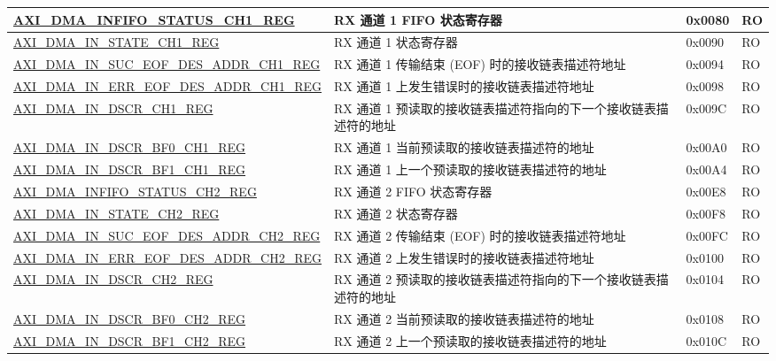 \begin{longtable}{ | l | l | p{1.3cm} | l | }
\hyperref[regdesc:AXIDMAINFIFOSTATUSCHNREG]{AXI\_DMA\_INFIFO\_STATUS\_CH1\_REG} & RX 通道 1 FIFO 状态寄存器 & 0x0080 & RO \\ \hline
\hyperref[regdesc:AXIDMAINSTATECHNREG]{AXI\_DMA\_IN\_STATE\_CH1\_REG} & RX 通道 1 状态寄存器 & 0x0090 & RO \\ \hline
\hyperref[regdesc:AXIDMAINSUCEOFDESADDRCHNREG]{AXI\_DMA\_IN\_SUC\_EOF\_DES\_ADDR\_CH1\_REG} & RX 通道 1 传输结束 (EOF) 时的接收链表描述符地址 & 0x0094 & RO \\ \hline
\hyperref[regdesc:AXIDMAINERREOFDESADDRCHNREG]{AXI\_DMA\_IN\_ERR\_EOF\_DES\_ADDR\_CH1\_REG} & RX 通道 1 上发生错误时的接收链表描述符地址 & 0x0098 & RO \\ \hline
\hyperref[regdesc:AXIDMAINDSCRCHNREG]{AXI\_DMA\_IN\_DSCR\_CH1\_REG} & RX 通道 1 预读取的接收链表描述符指向的下一个接收链表描述符的地址 & 0x009C & RO \\ \hline
\hyperref[regdesc:AXIDMAINDSCRBF0CHNREG]{AXI\_DMA\_IN\_DSCR\_BF0\_CH1\_REG} & RX 通道 1 当前预读取的接收链表描述符的地址 & 0x00A0 & RO \\ \hline
\hyperref[regdesc:AXIDMAINDSCRBF1CHNREG]{AXI\_DMA\_IN\_DSCR\_BF1\_CH1\_REG} & RX 通道 1  上一个预读取的接收链表描述符的地址 & 0x00A4 & RO \\ \hline
\hyperref[regdesc:AXIDMAINFIFOSTATUSCHNREG]{AXI\_DMA\_INFIFO\_STATUS\_CH2\_REG} & RX 通道 2 FIFO 状态寄存器 & 0x00E8 & RO \\ \hline
\hyperref[regdesc:AXIDMAINSTATECHNREG]{AXI\_DMA\_IN\_STATE\_CH2\_REG} & RX 通道 2 状态寄存器 & 0x00F8 & RO \\ \hline
\hyperref[regdesc:AXIDMAINSUCEOFDESADDRCHNREG]{AXI\_DMA\_IN\_SUC\_EOF\_DES\_ADDR\_CH2\_REG} & RX 通道 2 传输结束 (EOF) 时的接收链表描述符地址 & 0x00FC & RO \\ \hline
\hyperref[regdesc:AXIDMAINERREOFDESADDRCHNREG]{AXI\_DMA\_IN\_ERR\_EOF\_DES\_ADDR\_CH2\_REG} & RX 通道 2 上发生错误时的接收链表描述符地址 & 0x0100 & RO \\ \hline
\hyperref[regdesc:AXIDMAINDSCRCHNREG]{AXI\_DMA\_IN\_DSCR\_CH2\_REG} & RX 通道 2 预读取的接收链表描述符指向的下一个接收链表描述符的地址 & 0x0104 & RO \\ \hline
\hyperref[regdesc:AXIDMAINDSCRBF0CHNREG]{AXI\_DMA\_IN\_DSCR\_BF0\_CH2\_REG} & RX 通道 2  当前预读取的接收链表描述符的地址 & 0x0108 & RO \\ \hline
\hyperref[regdesc:AXIDMAINDSCRBF1CHNREG]{AXI\_DMA\_IN\_DSCR\_BF1\_CH2\_REG} & RX 通道 2  上一个预读取的接收链表描述符的地址 & 0x010C & RO \\ \hline

\end{longtable}

